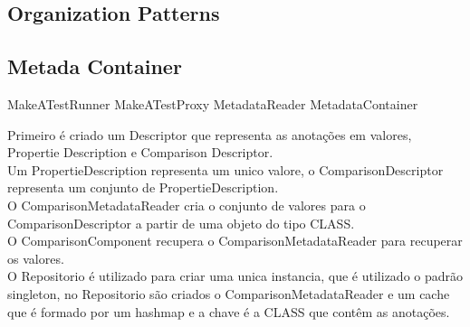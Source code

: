 \documentclass{abnt}
\begin{document}
\subsection{Organization Patterns}

\subsection{Metada Container}
MakeATestRunner
MakeATestProxy
MetadataReader
MetadataContainer


Primeiro é criado um Descriptor que representa as anotações em valores, Propertie Description e Comparison Descriptor.\\
Um PropertieDescription representa um unico valore, o ComparisonDescriptor representa um conjunto de PropertieDescription.\\

O ComparisonMetadataReader cria o conjunto de valores para o ComparisonDescriptor a partir de uma objeto do tipo CLASS.\\

O ComparisonComponent recupera o ComparisonMetadataReader para recuperar os valores.\\

O Repositorio é utilizado para criar uma unica instancia, que é utilizado o padrão singleton, no Repositorio são criados o ComparisonMetadataReader e um cache que é formado por um hashmap e a chave é a CLASS que contêm as anotações.



\end{document}
